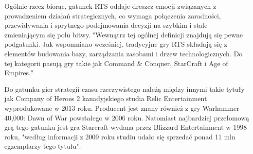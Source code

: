 Ogólnie rzecz biorąc, gatunek RTS oddaje dreszcz emocji związanych z prowadzeniem działań strategicznych, co wymaga połączenia zaradności,
przewidywania i sprytnego podejmowania decyzji na szybkim i stale zmieniającym się polu bitwy.
"Wewnątrz tej ogólnej definicji znajdują się pewne podgatunki. Jak wspomniano wcześniej, tradycyjne gry RTS składają się z elementów budowania bazy, zarządzania zasobami i drzew technologicznych. Do tej kategorii pasują gry takie jak Command \& Conquer, StarCraft i Age of Empires."\cite{stateoftherts}

Do gatunku gier strategii czasu rzeczywistego należą między innymi takie tytuły jak Company of Heroes 2 kanadyjskiego studia 
Relic Entertainment wyprodukowane w 2013 roku. Producent jest znany również z gry Warhammer 40,000: Dawn of War powstałego w 2006 roku.
Natomiast najbardziej przełomową grą tego gatunku jest gra Starcraft wydana przez Blizzard Entertainment w 1998 roku, "według informacji z 2009 roku studiu udało się sprzedać ponad 11 mln egzemplarzy tego tytułu"\cite{rtslist}.
